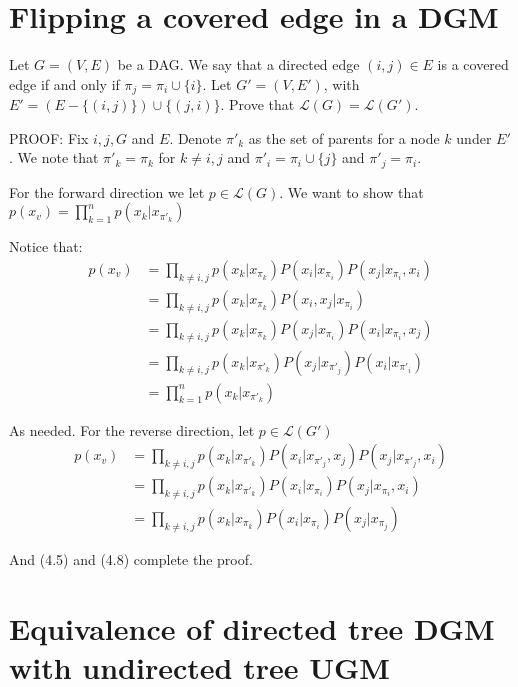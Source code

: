 \documentclass[paper=a4, fontsize=11pt]{scrartcl} %
\numberwithin{equation}{section} %
\numberwithin{figure}{section} %
\numberwithin{table}{section} %
\begin{document}
\section{Flipping a covered edge in a DGM}
Let $G = (V, E)$ be a DAG. We say that a directed edge $(i, j) \in E$ is a covered edge if and only
if $\pi_j = \pi_i \cup \{i\}$. Let $G' = (V, E')$, with $E' = (E-\{(i, j)\}) \cup \{(j, i)\}$. Prove that $\mathcal{L}(G) = \mathcal{L}(G')$.

PROOF: Fix $i,j, G$ and $E$. Denote \(\pi'_k\) as the set of parents for a node $k$ under $E'$. We note that \(\pi'_k = \pi_k\) for \(k\ne i,j\) and \(\pi'_i = \pi_i \cup \{j\}\) and \(\pi'_j = \pi_i\).

For the forward direction we let $p \in \mathcal{L}(G)$. 
We want to show that \(p(x_v)=\prod_{k=1}^{n}p(x_k|x_{\pi'_k})\)

Notice that: 
\begin{align}
p(x_v)&=\prod_{k\ne i,j}p(x_k|x_{\pi_k})P(x_i|x_{\pi_i})P(x_j|x_{\pi_i}, x_i) \\
&= \prod_{k\ne i,j}p(x_k|x_{\pi_k})P(x_i, x_j|x_{\pi_i}) \\
&= \prod_{k\ne i,j}p(x_k|x_{\pi_k})P(x_j|x_{\pi_i})P(x_i|x_{\pi_i}, x_j) \\
&= \prod_{k\ne i,j}p(x_k|x_{\pi'_k})P(x_j|x_{\pi'_j})P(x_i|x_{\pi'_i})\\
&=\prod_{k=1}^{n}p(x_k|x_{\pi'_k})
\end{align}

As needed. For the reverse direction, let $p \in \mathcal{L}(G')$
\begin{align}
p(x_v)&=\prod_{k\ne i,j}p(x_k|x_{\pi'_k})P(x_i|x_{\pi'_j}, x_j)P(x_j|x_{\pi'_j}, x_i) \\
&= \prod_{k\ne i,j}p(x_k|x_{\pi'_k})P(x_i|x_{\pi_i})P(x_j|x_{\pi_i}, x_i) \\
&= \prod_{k\ne i,j}p(x_k|x_{\pi_k})P(x_i|x_{\pi_i})P(x_j|x_{\pi_j})
\end{align}

And (4.5) and (4.8) complete the proof.

\section{Equivalence of directed tree DGM with undirected tree UGM}
\end{document}
